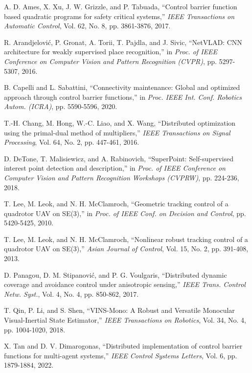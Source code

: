\begin{thebibliography}{99}
 A. D. Ames, X. Xu, J. W. Grizzle, and P. Tabuada, ``Control barrier function based quadratic programs for safety critical systems,'' {\it IEEE Transactions on Automatic Control}, Vol. 62, No. 8, pp. 3861-3876, 2017.

 R. Arandjelović, P. Gronat, A. Torii, T. Pajdla, and J. Sivic, ``NetVLAD: CNN architecture for weakly supervised place recognition,'' in {\it Proc. of IEEE Conference on Computer Vision and Pattern Recognition (CVPR)}, pp. 5297-5307, 2016.

 B. Capelli and L. Sabattini, ``Connectivity maintenance: Global and optimized approach through control barrier functions,'' in {\it Proc. IEEE Int. Conf. Robotics Autom. (ICRA)}, pp. 5590-5596, 2020.

 T.-H. Chang, M. Hong, W.-C. Liao, and X. Wang, ``Distributed optimization using the primal-dual method of multipliers,'' {\it IEEE Transactions on Signal Processing}, Vol. 64, No. 2, pp. 447-461, 2016.

 D. DeTone, T. Malisiewicz, and A. Rabinovich, ``SuperPoint: Self-supervised interest point detection and description,'' in {\it Proc. of IEEE Conference on Computer Vision and Pattern Recognition Workshops (CVPRW)}, pp. 224-236, 2018.

 T. Lee, M. Leok, and N. H. McClamroch, ``Geometric tracking control of a quadrotor UAV on SE(3),'' in {\it Proc. of IEEE Conf. on Decision and Control}, pp. 5420-5425, 2010.

 T. Lee, M. Leok, and N. H. McClamroch, ``Nonlinear robust tracking control of a quadrotor UAV on SE(3),'' {\it Asian Journal of Control}, Vol. 15, No. 2, pp. 391-408, 2013.

 D. Panagou, D. M. Stipanović, and P. G. Voulgaris, ``Distributed dynamic coverage and avoidance control under anisotropic sensing,'' {\it IEEE Trans. Control Netw. Syst.}, Vol. 4, No. 4, pp. 850-862, 2017.

 T. Qin, P. Li, and S. Shen, ``VINS-Mono: A Robust and Versatile Monocular Visual-Inertial State Estimator,'' {\it IEEE Transactions on Robotics}, Vol. 34, No. 4, pp. 1004-1020, 2018.

 X. Tan and D. V. Dimarogonas, ``Distributed implementation of control barrier functions for multi-agent systems,'' {\it IEEE Control Systems Letters}, Vol. 6, pp. 1879-1884, 2022.


\end{thebibliography}
